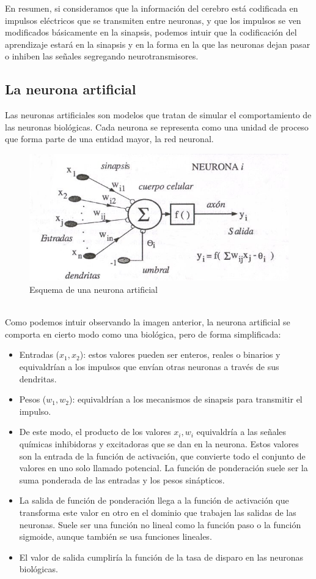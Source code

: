 En resumen, si consideramos que la información del cerebro está codificada en impulsos eléctricos que se transmiten entre neuronas, y que los impulsos se ven modificados básicamente en la sinapsis, podemos intuir que la codificación del aprendizaje estará en la sinapsis y en la forma en la que las neuronas dejan pasar o inhiben las señales segregando neurotransmisores.

\subsection {La neurona artificial} \mbox{}
Las neuronas artificiales son modelos que tratan de simular el comportamiento de las neuronas biológicas. Cada neurona se representa como una unidad de proceso que forma parte de una entidad mayor, la red neuronal.
\begin{figure}[htp]
\centering
\includegraphics[scale=1]{images/neuronaartificial.jpg}
\caption{Esquema de una neurona artificial}
\end{figure}\\
Como podemos intuir observando la imagen anterior, la neurona artificial se comporta en cierto modo como una biológica, pero de forma simplificada:
\begin{itemize}
\item Entradas (${x_{1}, x_{2}}$): estos valores pueden ser enteros, reales o binarios y equivaldrían a los impulsos que envían otras neuronas a través de sus dendritas.
\item Pesos (${w_{1}, w_{2}}$): equivaldrían a los mecanismos de sinapsis para transmitir el impulso.
\item De este modo, el producto de los valores ${x_{i} , w_{i}}$ equivaldría a las señales químicas inhibidoras y excitadoras que se dan en la neurona. Estos valores son la entrada de la función de activación, que convierte todo el conjunto de valores en uno solo llamado potencial. La función de ponderación suele ser la suma ponderada de las entradas y los pesos sinápticos.
\item La salida de función de ponderación llega a la función de activación que transforma este valor en otro en el dominio que trabajen las salidas de las neuronas. Suele ser una función no lineal como la función paso o la función sigmoide, aunque también se usa funciones lineales.
\item El valor de salida cumpliría la función de la tasa de disparo en las neuronas biológicas.
\end{itemize}
